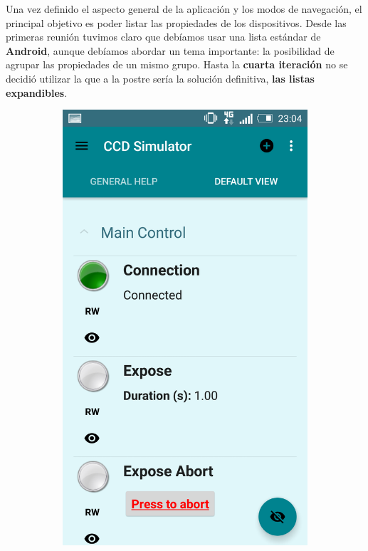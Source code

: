 Una vez definido el aspecto general de la aplicación y los modos de navegación, el principal objetivo es poder listar las propiedades de los dispositivos. Desde las primeras reunión tuvimos claro que debíamos usar una lista estándar de \textbf{Android}, aunque debíamos abordar un tema importante: la posibilidad de agrupar las propiedades de un mismo grupo.
Hasta la \textbf{cuarta iteración} no se decidió utilizar la que a la postre sería la solución definitiva, \textbf{las listas expandibles}.

\begin{figure}
    \centering
    \begin{subfigure}[]{0.4\textwidth}
        \includegraphics[width=\textwidth]{../images/captura10.png}

\end{subfigure}
\end{figure}
